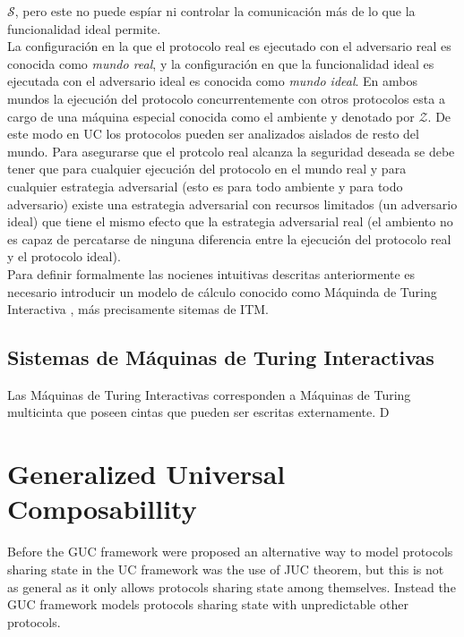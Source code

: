 $\mathcal{S}$, pero este no puede espíar ni controlar la comunicación más de lo que la funcionalidad ideal
permite.\\
La configuración en la que el protocolo real es ejecutado con el adversario real es conocida como \textit{mundo
real}, y la configuración en que la funcionalidad ideal es ejecutada con el adversario ideal es conocida como
\textit{mundo ideal}. En ambos mundos la ejecución del protocolo concurrentemente con otros protocolos esta a cargo
de una máquina especial conocida como el ambiente y denotado por $\mathcal{Z}$. De este modo en UC los protocolos
pueden ser analizados aislados de resto del mundo. Para asegurarse que el protcolo real alcanza la seguridad deseada
se debe tener que para cualquier ejecución del protocolo en el mundo real y para cualquier estrategia adversarial
(esto es para todo ambiente y para todo adversario) existe una estrategia adversarial con recursos limitados (un
adversario ideal) que tiene el mismo efecto que la estrategia adversarial real (el ambiento no es capaz de percatarse
de ninguna diferencia entre la ejecución del protocolo real y el protocolo ideal).\\
Para definir formalmente las nocienes intuitivas descritas anteriormente es necesario introducir un modelo de
cálculo conocido como Máquinda de Turing Interactiva , más precisamente sitemas de ITM.

\subsection{Sistemas de Máquinas de Turing Interactivas}
Las Máquinas de Turing Interactivas corresponden a Máquinas de Turing multicinta que poseen cintas que pueden ser
escritas externamente. D

\section{Generalized Universal Composabillity}

Before the GUC framework were proposed an alternative way
to model protocols sharing state in the UC framework was the use of JUC theorem, but this is not as general as
it only allows protocols sharing state among themselves. Instead the GUC framework models protocols sharing state with
unpredictable other protocols.\\

